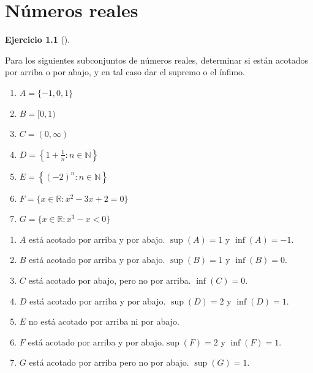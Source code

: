 \documentclass[
  a4paper,
]{scrreport}
\providecommand{\tightlist}{%
  \setlength{\itemsep}{0pt}\setlength{\parskip}{0pt}}\usepackage{longtable,booktabs,array}
\theoremstyle{definition}
\newtheorem{exercise}{Ejercicio}[chapter]
\theoremstyle{remark}
\begin{document}

\hypertarget{nuxfameros-reales}{%
\chapter{Números reales}\label{nuxfameros-reales}}

\leavevmode{}%
\begin{exercise}[]\label{exr-supremos-infimos-reales}

Para los siguientes subconjuntos de números reales, determinar si están
acotados por arriba o por abajo, y en tal caso dar el supremo o el
ínfimo.

\begin{enumerate}
\def\labelenumi{\alph{enumi}.}
\tightlist
\item
  \(A = \{-1,0,1\}\)
\item
  \(B= [0,1)\)
\item
  \(C= (0,\infty)\)
\item
  \(D= \left\{1+\frac{1}{n}:n\in\mathbb{N}\right\}\)
\item
  \(E= \left\{(-2)^n:n\in\mathbb{N}\right\}\)
\item
  \(F= \{x\in\mathbb{R}:x^2-3x+2=0\}\)
\item
  \(G= \{x\in\mathbb{R}:x^3-x<0\}\)
\end{enumerate}

\end{exercise}

\begin{tcolorbox}[enhanced jigsaw, breakable, title=\textcolor{quarto-callout-tip-color}{\faLightbulb}\hspace{0.5em}{Solución}, left=2mm, leftrule=.75mm, colback=white, bottomtitle=1mm, coltitle=black, bottomrule=.15mm, colframe=quarto-callout-tip-color-frame, colbacktitle=quarto-callout-tip-color!10!white, rightrule=.15mm, opacitybacktitle=0.6, arc=.35mm, toprule=.15mm, opacityback=0, toptitle=1mm, titlerule=0mm]

\begin{enumerate}
\def\labelenumi{\alph{enumi}.}
\item
  \(A\) está acotado por arriba y por abajo. \(\sup(A)=1\) y
  \(\inf(A)=-1\).
\item
  \(B\) está acotado por arriba y por abajo. \(\sup(B)=1\) y
  \(\inf(B)=0\).
\item
  \(C\) está acotado por abajo, pero no por arriba. \(\inf(C)=0\).
\item
  \(D\) está acotado por arriba y por abajo. \(\sup(D)=2\) y
  \(\inf(D)=1\).
\item
  \(E\) no está acotado por arriba ni por abajo.
\item
  \(F\) está acotado por arriba y por abajo.\(\sup(F)=2\) y
  \(\inf(F)=1\).
\item
  \(G\) está acotado por arriba pero no por abajo. \(\sup(G)=1\).
\end{enumerate}

\end{tcolorbox}
\end{document}
